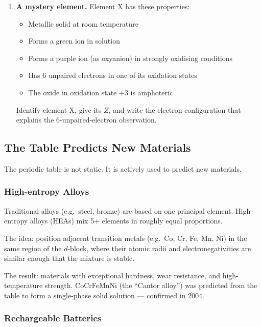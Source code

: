 \documentclass[12pt, a4paper]{book}
\begin{document}
\begin{problembox}
\begin{enumerate}[label=\textbf{\arabic*.}]
  \item \textbf{A mystery element.}
        Element X has these properties:
        \begin{itemize}[nosep]
          \item Metallic solid at room temperature
          \item Forms a green ion  in solution
          \item Forms a purple ion  (as oxyanion)
                in strongly oxidising conditions
          \item Has 6 unpaired electrons in one of its oxidation states
          \item The oxide in oxidation state +3 is amphoteric
        \end{itemize}
        Identify element X, give its $Z$, and write the
        electron configuration that explains the
        6-unpaired-electron observation.
\end{enumerate}
\end{problembox}

\subsection{The Table Predicts New Materials}

The periodic table is not static.
It is actively used to predict new materials.

\subsubsection{High-entropy Alloys}

Traditional alloys (e.g.\ steel, bronze) are based on one
principal element.
High-entropy alloys (HEAs) mix 5+ elements in roughly equal
proportions.

The idea: position adjacent transition metals
(e.g.\ Co, Cr, Fe, Mn, Ni) in the same region of the
$d$-block, where their atomic radii and electronegativities
are similar enough that the mixture is stable.

The result: materials with exceptional hardness, wear
resistance, and high-temperature strength.
CoCrFeMnNi (the ``Cantor alloy'') was predicted from the
table to form a single-phase solid solution --- confirmed in 2004.

\subsubsection{Rechargeable Batteries}
\end{document}
